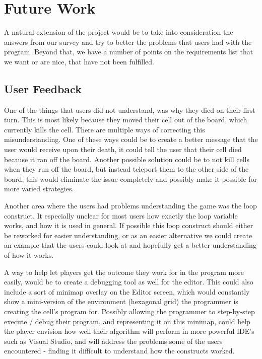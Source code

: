 \section{Future Work}
A natural extension of the project would be to take into consideration the answers from our survey and try to better the problems that users had with the program. Beyond that, we have a number of points on the requirements list that we want or are nice, that have not been fulfilled.

\subsection{User Feedback}
One of the things that users did not understand, was why they died on their first turn. This is most likely because they moved their cell out of the board, which currently kills the cell. There are multiple ways of correcting this misunderstanding. One of these ways could be to create a better message that the user would receive upon their death, it could tell the user that their cell died because it ran off the board. Another possible solution could be to not kill cells when they run off the board, but instead teleport them to the other side of the board, this would eliminate the issue completely and possibly make it possible for more varied strategies.\newline

Another area where the users had problems understanding the game was the loop construct. It especially unclear for most users how exactly the loop variable works, and how it is used in general. If possible this loop construct should either be reworked for easier understanding, or as an easier alternative we could create an example that the users could look at and hopefully get a better understanding of how it works.


A way to help let players get the outcome they work for in the program more easily, would be to create a debugging tool as well for the editor. This could also include a sort of minimap overlay on the Editor screen, which would constantly show a mini-version of the environment (hexagonal grid) the programmer is creating the cell's program for. Possibly allowing the programmer to step-by-step execute / debug their program, and representing it on this minimap, could help the player envision how well their algorithm will perform in more powerful IDE's such as Visual Studio, and will address the problems some of the users encountered - finding it difficult to understand how the constructs worked.

